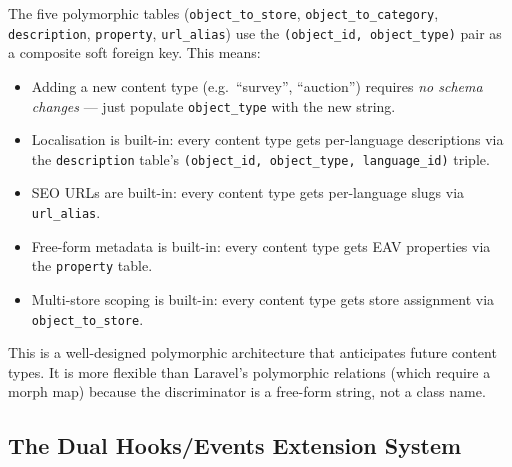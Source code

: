 \documentclass[11pt,a4paper]{article}
\begin{document}
\begin{goodbox}
The five polymorphic tables (\texttt{object\_to\_store},
\texttt{object\_to\_category}, \texttt{description},
\texttt{property}, \texttt{url\_alias}) use the
\texttt{(object\_id, object\_type)} pair as a composite soft foreign
key. This means:

\begin{itemize}[leftmargin=1.6em,itemsep=2pt]
  \item Adding a new content type (e.g.\ ``survey'', ``auction'')
        requires \emph{no schema changes} --- just populate
        \texttt{object\_type} with the new string.
  \item Localisation is built-in: every content type gets per-language
        descriptions via the \texttt{description} table's
        \texttt{(object\_id, object\_type, language\_id)} triple.
  \item SEO URLs are built-in: every content type gets per-language
        slugs via \texttt{url\_alias}.
  \item Free-form metadata is built-in: every content type gets EAV
        properties via the \texttt{property} table.
  \item Multi-store scoping is built-in: every content type gets
        store assignment via \texttt{object\_to\_store}.
\end{itemize}

This is a well-designed polymorphic architecture that anticipates
future content types. It is more flexible than Laravel's polymorphic
relations (which require a morph map) because the discriminator is a
free-form string, not a class name.
\end{goodbox}

\subsection{The Dual Hooks/Events Extension System}
\end{document}
